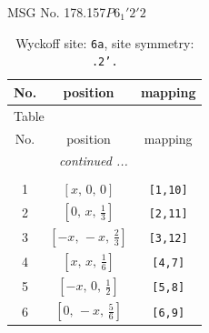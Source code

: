 \documentclass[fleqn,8pt]{jsarticle}
\begin{document}
\setcounter{MaxMatrixCols}{32}

\renewcommand{\tablename}{Table~}
\renewcommand{\figurename}{Figure~}
\begin{center}
\LARGE
MSG No. 178.157\quad$P6_{1}'2'2$
\end{center}
\renewcommand{\arraystretch}{1.2}
\begin{longtable}{ccc}
\caption{Wyckoff site: {\tt 6a}, site symmetry: {\tt .2'.}}
 \\
 \hline \hline
No. & position & mapping \\ \hline \endfirsthead

\multicolumn{2}{l}{\tablename\ \thetable{}} \\
 \hline \hline
No. & position & mapping \\ \hline \endhead

 \hline \hline
\multicolumn{2}{r}{\footnotesize\it continued ...} \\ \endfoot

 \hline \hline
\multicolumn{2}{r}{} \\ \endlastfoot

1 & $\left[ x,\, 0,\, 0 \right]$ & {\tt [1,10]} \\ \hline
2 & $\left[ 0,\, x,\, \frac{1}{3} \right]$ & {\tt [2,11]} \\ \hline
3 & $\left[ - x,\, - x,\, \frac{2}{3} \right]$ & {\tt [3,12]} \\ \hline
4 & $\left[ x,\, x,\, \frac{1}{6} \right]$ & {\tt [4,7]} \\ \hline
5 & $\left[ - x,\, 0,\, \frac{1}{2} \right]$ & {\tt [5,8]} \\ \hline
6 & $\left[ 0,\, - x,\, \frac{5}{6} \right]$ & {\tt [6,9]} \\
\end{longtable}
\renewcommand{\arraystretch}{1.2}
\end{document}
